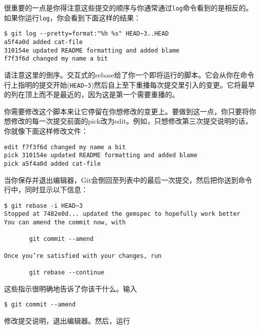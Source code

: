 \documentclass[a4paper]{book}
\begin{document}
很重要的一点是你得注意这些提交的顺序与你通常通过\texttt{log}命令看到的是相反的。如果你运行\texttt{log}，你会看到下面这样的结果：

\begin{shaded}\begin{verbatim}
$ git log --pretty=format:"%h %s" HEAD~3..HEAD
a5f4a0d added cat-file
310154e updated README formatting and added blame
f7f3f6d changed my name a bit
\end{verbatim}\end{shaded}

请注意这里的倒序。交互式的rebase给了你一个即将运行的脚本。它会从你在命令行上指明的提交开始(\texttt{HEAD\textasciitilde{}3})然后自上至下重播每次提交里引入的变更。它将最早的列在顶上而不是最近的，因为这是第一个需要重播的。

你需要修改这个脚本来让它停留在你想修改的变更上。要做到这一点，你只要将你想修改的每一次提交前面的pick改为edit。例如，只想修改第三次提交说明的话，你就像下面这样修改文件：

\begin{shaded}\begin{verbatim}
edit f7f3f6d changed my name a bit
pick 310154e updated README formatting and added blame
pick a5f4a0d added cat-file
\end{verbatim}\end{shaded}

当你保存并退出编辑器，Git会倒回至列表中的最后一次提交，然后把你送到命令行中，同时显示以下信息：

\begin{shaded}\begin{verbatim}
$ git rebase -i HEAD~3
Stopped at 7482e0d... updated the gemspec to hopefully work better
You can amend the commit now, with

       git commit --amend

Once you’re satisfied with your changes, run

       git rebase --continue
\end{verbatim}\end{shaded}

这些指示很明确地告诉了你该干什么。输入

\begin{shaded}\begin{verbatim}
$ git commit --amend
\end{verbatim}\end{shaded}

修改提交说明，退出编辑器。然后，运行
\end{document}
